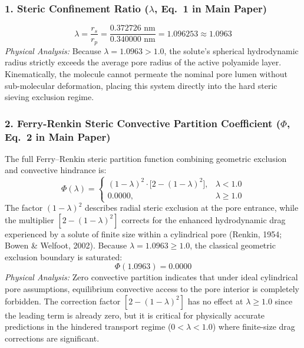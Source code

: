 \documentclass[11pt]{article}
\begin{document}
\subsubsection{1. Steric Confinement Ratio ($\lambda$, Eq.~1 in Main Paper)}
\begin{equation}
\lambda = \frac{r_s}{r_p} = \frac{0.372726\text{ nm}}{0.340000\text{ nm}} = 1.096253 \approx 1.0963
\end{equation}
\noindent\textit{Physical Analysis:} Because $\lambda = 1.0963 > 1.0$, the solute's spherical hydrodynamic radius strictly exceeds the average pore radius of the active polyamide layer. Kinematically, the molecule cannot permeate the nominal pore lumen without sub-molecular deformation, placing this system directly into the hard steric sieving exclusion regime.

\subsubsection{2. Ferry-Renkin Steric Convective Partition Coefficient ($\Phi$, Eq.~2 in Main Paper)}
The full Ferry--Renkin steric partition function combining geometric exclusion and convective hindrance is:
\begin{equation}
\Phi(\lambda) = \begin{cases}
(1 - \lambda)^2 \cdot \bigl[2 - (1 - \lambda)^2\bigr], & \lambda < 1.0 \\
0.0000, & \lambda \ge 1.0
\end{cases}
\end{equation}
The factor $(1-\lambda)^2$ describes radial steric exclusion at the pore entrance, while the multiplier $[2-(1-\lambda)^2]$ corrects for the enhanced hydrodynamic drag experienced by a solute of finite size within a cylindrical pore (Renkin, 1954; Bowen \& Welfoot, 2002). Because $\lambda = 1.0963 \ge 1.0$, the classical geometric exclusion boundary is saturated:
\begin{equation}
\Phi(1.0963) = 0.0000
\end{equation}
\noindent\textit{Physical Analysis:} Zero convective partition indicates that under ideal cylindrical pore assumptions, equilibrium convective access to the pore interior is completely forbidden. The correction factor $[2-(1-\lambda)^2]$ has no effect at $\lambda \ge 1.0$ since the leading term is already zero, but it is critical for physically accurate predictions in the hindered transport regime ($0 < \lambda < 1.0$) where finite-size drag corrections are significant.
\end{document}
